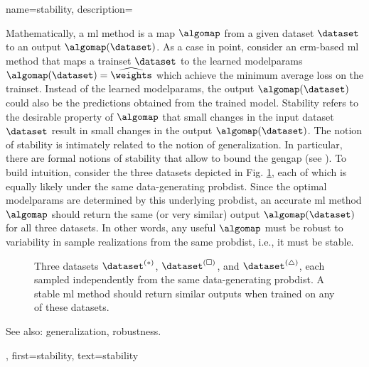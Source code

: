 {name={stability},
	description={
	Mathematically, a \gls{ml} method is a map $\algomap$ from a given \gls{dataset} $\dataset$ 
	to an output $\algomap(\dataset)$. As a case in point, consider an \gls{erm}-based 
	\gls{ml} method that maps a \gls{trainset} $\dataset$ to the learned \glspl{modelparam} 
	$\algomap(\dataset) = \widehat{\weights}$ which achieve the minimum average \gls{loss} 
	on the \gls{trainset}. Instead of the learned \glspl{modelparam}, the 
	output $\algomap(\dataset)$ could also be the \glspl{prediction} obtained from 
	the trained \gls{model}. Stability refers to the desirable property 
	of $\algomap$ that small changes in the input \gls{dataset} $\dataset$ result in small 
	changes in the output $\algomap(\dataset)$. The notion of stability is intimately related 
	to the notion of \gls{generalization}. In particular, there are formal notions of stability  
	that allow to bound the \gls{gengap} (see \cite[Ch.~13]{ShalevMLBook}).
		To build intuition, consider the three \glspl{dataset} depicted in Fig. \ref{fig_three_data_stability_dict}, each 
		of which is equally likely under the same \gls{data}-generating \gls{probdist}. Since the 
		optimal \glspl{modelparam} are determined by this underlying \gls{probdist}, an accurate 
		\gls{ml} method $\algomap$ should return the same (or very similar) output $\algomap(\dataset)$ 
		for all three \glspl{dataset}. In other words, any useful $\algomap$ must be robust to 
		variability in \gls{sample} \glspl{realization} from the same \gls{probdist}, i.e., it must be stable. 
		\begin{figure}[H]
			\centering
			\caption{Three \glspl{dataset} $\dataset^{(*)}$, $\dataset^{(\square)}$, 
			and $\dataset^{(\triangle)}$, each sampled independently from the same 
			\gls{data}-generating \gls{probdist}. A stable \gls{ml} method should return 
			similar outputs when trained on any of these \glspl{dataset}. \label{fig_three_data_stability_dict}}
		\end{figure}
		See also: \gls{generalization}, \gls{robustness}.}, 
	first={stability}, 
	text={stability} 
}

